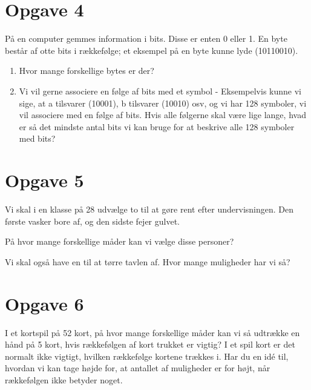 \section*{Opgave 4}
På en computer gemmes information i bits. Disse er enten 0 eller 1. En byte består af otte bits i rækkefølge; et eksempel på en byte kunne lyde (10110010).
\begin{enumerate}[label=\roman*)]
\item Hvor mange forskellige bytes er der?
\item Vi vil gerne associere en følge af bits med et symbol - Eksempelvis kunne vi sige, at a tilsvarer (10001), b tilsvarer (10010) osv, og vi har 128 symboler, vi vil associere med en følge af bits. Hvis alle følgerne skal være lige lange, hvad er så det mindste antal bits vi kan bruge for at beskrive alle 128 symboler med bits?
\end{enumerate}
\section*{Opgave 5}
Vi skal i en klasse på 28 udvælge to til at gøre rent efter undervisningen. Den første vasker bore af, og den sidste fejer gulvet. 
\item På hvor mange forskellige måder kan vi vælge disse personer?
\item Vi skal også have en til at tørre tavlen af. Hvor mange muligheder har vi så?

\section*{Opgave 6}
I et kortspil på 52 kort, på hvor mange forskellige måder kan vi så udtrække en hånd på 5 kort, hvis rækkefølgen af kort trukket er vigtig? I et spil kort er det normalt ikke vigtigt, hvilken rækkefølge kortene trækkes i. Har du en idé til, hvordan vi kan tage højde for, at antallet af muligheder er for højt, når rækkefølgen ikke betyder noget. 
